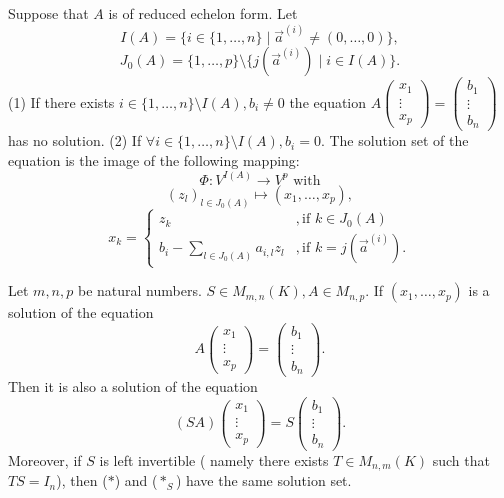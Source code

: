 \begin{theoremenv}
    Suppose that $A$ is of reduced echelon form. Let 
    $$I(A)=\{i\in \{1,\dots,n\}\mid \vec{a}^{(i)}\not=(0,\dots,0)\},$$
    $$J_0(A)=\{1,\dots,p\}\setminus\{j\left(\vec{a}^{(i)}\right)\mid i\in I(A)\}.$$
    (1) If there exists $i\in \{1,\dots,n\}\setminus I(A),b_i\not=0$ the equation $A\begin{pmatrix}
 x_1\\
 \vdots\\
x_p
\end{pmatrix}=
\begin{pmatrix}
 b_1\\
 \vdots\\
b_n
\end{pmatrix}$ has no solution.
\newline
(2) If $\forall i\in\{1,\dots ,n\}\setminus I(A),b_i=0$. The solution set of the equation is the image of the following mapping:
$$\Phi:V^{I(A)}\longrightarrow V^p \text{ with}$$
$$(z_l)_{l\in J_0(A)}\longmapsto (x_1,\dots,x_p),$$
$$x_k=\left\{ \begin{matrix}
    z_k &,\text{if } k\in J_0(A)\\
    b_i-\sum_{l\in J_0(A)}a_{i,l}z_l &,\text{if } k=j\left(\vec{a}^{(i)}\right) .
\end{matrix}\right.$$

\end{theoremenv}
\begin{propositionenv}
    Let $m,n,p$ be natural numbers. $S\in M_{m,n}(K), A\in M_{n,p}$. If $(x_1,\dots,x_p)$ is a solution of the equation
    \begin{equation*}
        A\begin{pmatrix}
        x_1\\
        \vdots\\
        x_p
        \end{pmatrix}=\begin{pmatrix}
        b_1\\
        \vdots\\
        b_n
        \end{pmatrix}.\tag{$*$}
    \end{equation*}
    Then it is also a solution of the equation
    \begin{equation*}(SA)\begin{pmatrix}
        x_1\\
        \vdots\\
        x_p
        \end{pmatrix}=S\begin{pmatrix}
        b_1\\
        \vdots\\
        b_n
        \end{pmatrix}.\tag{$*_S$}
        \end{equation*}
    Moreover, if $S$ is left invertible ( namely there exists $T\in M_{n,m}(K)$ such that $TS=I_n$), then ($*$) and ($*_S$) have the same solution set.
\end{propositionenv}
